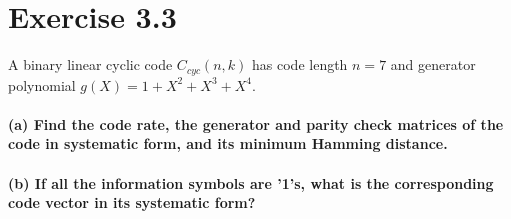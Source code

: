 \documentclass[Main]{subfiles}
\begin{document}
\section*{Exercise 3.3}

A binary linear cyclic code $C_{cyc}(n, k)$ has code length $n = 7$ and generator polynomial $g(X) = 1 + X^2 + X^3 + X^4$.

\paragraph{(a) Find the code rate, the generator and parity check matrices of the code in
systematic form, and its minimum Hamming distance.}


\paragraph{(b) If all the information symbols are '1's, what is the corresponding code vector in its systematic form?}
\end{document}
